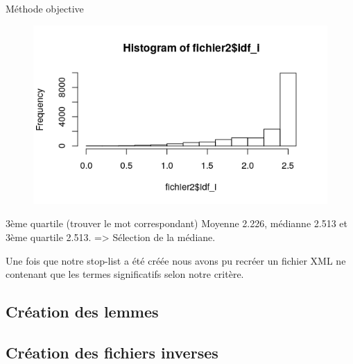 \documentclass{article}
\begin{document}
Méthode objective
\begin{figure}
\begin{center}
\includegraphics{rapport/hist_idf.png} 
\end{center}
\end{figure}

3ème quartile (trouver le mot correspondant)
Moyenne 2.226, médianne 2.513 et 3ème quartile 2.513. => Sélection de la médiane.

Une fois que notre stop-list a été créée nous avons pu recréer un fichier XML ne contenant que les termes significatifs selon notre critère.

\subsection{Création des lemmes}

\subsection{Création des fichiers inverses}
\end{document}
